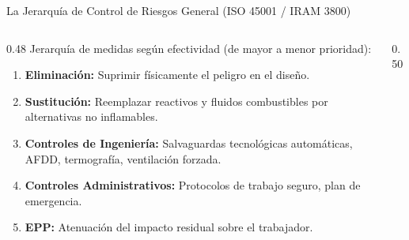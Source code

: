 \begin{frame}{La Jerarquía de Control de Riesgos General (ISO 45001 / IRAM 3800)}
  \begin{columns}[c]
    \begin{column}{0.48\textwidth}
      \small
        Jerarquía de medidas según efectividad (de mayor a menor prioridad):
      \begin{enumerate}
        \scriptsize
        \item \textbf{Eliminación:} Suprimir físicamente el peligro en el diseño.
        \item \textbf{Sustitución:} Reemplazar reactivos y fluidos combustibles por alternativas no inflamables.
        \item \textbf{Controles de Ingeniería:} Salvaguardas tecnológicas automáticas, AFDD, termografía, ventilación forzada.
        \item \textbf{Controles Administrativos:} Protocolos de trabajo seguro,
            plan de emergencia.
        \item \textbf{EPP:} Atenuación del impacto residual sobre el trabajador.
      \end{enumerate}
    \end{column}

    \begin{column}{0.50\textwidth}
      \centering
    \end{column}
  \end{columns}
\end{frame}


